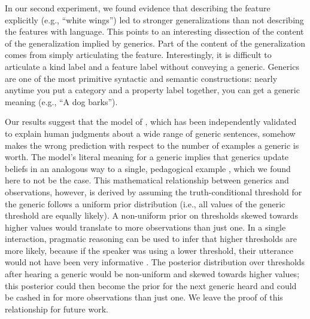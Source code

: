 \documentclass[10pt,letterpaper]{article}
\begin{document}
In our second experiment, we found evidence that describing the feature explicitly (e.g., ``white wings'') led to stronger generalizations than not describing the features with language. 
This points to an interesting dissection of the content of the generalization implied by generics. 
Part of the content of the generalization comes from simply articulating the feature. 
Interestingly, it is difficult to articulate a kind label and a feature label without conveying a generic. 
Generics are one of the most primitive syntactic and semantic constructions: nearly anytime you put a category and a property label together, you can get a generic meaning (e.g., ``A dog barks''). 

Our results suggest that the model of , which has been independently validated to explain human judgments about a wide range of generic sentences, somehow makes the wrong prediction with respect to the number of examples a generic is worth. 
The model's literal meaning for a generic implies that generics update beliefs in an analogous way to a single, pedagogical example \cite{tessler2020learning}, which we found here to not be the case.
This mathematical relationship between generics and observations, however, is derived by assuming the truth-conditional threshold for the generic follows a uniform prior distribution (i.e., all values of the generic threshold are equally likely). 
A non-uniform prior on thresholds skewed towards higher values would translate to more observations than just one. 
In a single interaction, pragmatic reasoning can be used to infer that higher thresholds are more likely, because if the speaker was using a lower threshold, their utterance would not have been very informative \cite{lassiter2017adjectival, tessler2020learning}. 
The posterior distribution over thresholds after hearing a generic would be non-uniform and skewed towards higher values; this posterior could then become the prior for the next generic heard and could be cashed in for more observations than just one. We leave the proof of this relationship for future work. 



\end{document}
